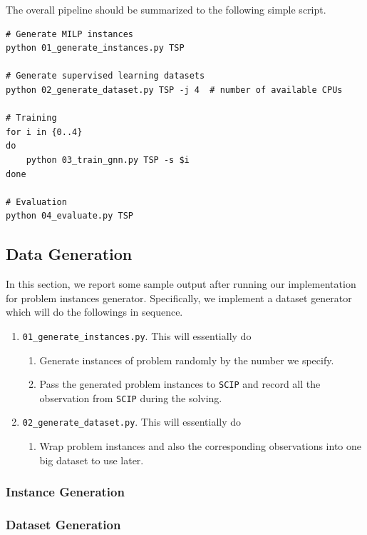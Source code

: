 \documentclass{article}
\begin{document}
The overall pipeline should be summarized to the following simple script.
\begin{lstlisting}[language=commandline]
# Generate MILP instances
python 01_generate_instances.py TSP

# Generate supervised learning datasets
python 02_generate_dataset.py TSP -j 4  # number of available CPUs

# Training
for i in {0..4}
do
    python 03_train_gnn.py TSP -s $i
done

# Evaluation
python 04_evaluate.py TSP
\end{lstlisting}

\subsection{Data Generation}\label{subsec:data-generation-code}
In this section, we report some sample output after running our implementation for problem instances generator. Specifically, we implement a dataset
generator which will do the followings in sequence.
\begin{enumerate}
	\item \texttt{01\_generate\_instances.py}. This will essentially do
	      \begin{enumerate}
		      \item Generate instances of problem randomly by the number we specify.
		      \item Pass the generated problem instances to \texttt{SCIP} and record all the observation from \texttt{SCIP} during the solving.
	      \end{enumerate}
	\item \texttt{02\_generate\_dataset.py}. This will essentially do
	      \begin{enumerate}
		      \item Wrap problem instances and also the corresponding observations into one big dataset to use later.
	      \end{enumerate}
\end{enumerate}
\subsubsection{Instance Generation}


\subsubsection{Dataset Generation}




\end{document}
